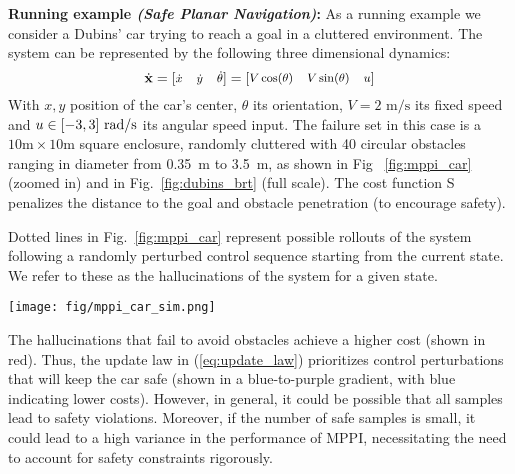 %
\begin{mdframed}[style=MyFrame,nobreak=false]
\textbf{Running example \textit{(Safe Planar Navigation)}:} 
As a running example we consider a Dubins' car trying to reach a goal in a cluttered environment. The system can be represented by the following three dimensional dynamics:
%
\begin{equation}\label{eq:dyn_car} \fontsize{8.5}{10}\selectfont
\dot{\state}
= \begin{bmatrix} \dot{x} & \dot{y} & \dot{\theta} \end{bmatrix}
= \begin{bmatrix} V \cos(\theta) & V \sin(\theta) & \ctrl \end{bmatrix}
\end{equation}
%
With $x,y$ position of the car's center, $\theta$ its orientation, $V=2 \text{ m/s}$ its fixed speed and $u \in [-3, 3] \text{ rad/s}$ its angular speed input. The failure set in this case is a $10 \text{m} \times 10 \text{m}$ square enclosure, randomly cluttered with 40 circular obstacles ranging in diameter from 0.35~m to 3.5~m, as shown in Fig ~\ref{fig:mppi_car} (zoomed in) and in Fig.~\ref{fig:dubins_brt} (full scale). The cost function S penalizes the distance to the goal and obstacle penetration (to encourage safety).

Dotted lines in Fig.~\ref{fig:mppi_car} represent possible rollouts of the system following a randomly perturbed control sequence starting from the current state. We refer to these as the hallucinations of the system for a given state. 

\vspace{1em}
{\centering      \texttt{[image: fig/mppi\_car\_sim.png]}
      \label{fig:mppi_car} 
\par}

The hallucinations that fail to avoid obstacles achieve a higher cost (shown in red). Thus, the update law in (\ref{eq:update_law}) prioritizes control perturbations that will keep the car safe (shown in a blue-to-purple gradient, with blue indicating lower costs). However, in general, it could be possible that all samples lead to safety violations. Moreover, if the number of safe samples is small, it could lead to a high variance in the performance of MPPI, necessitating the need to account for safety constraints rigorously.

\end{mdframed}


